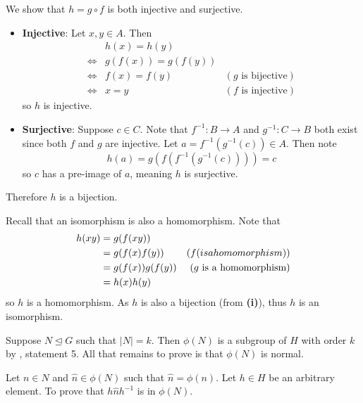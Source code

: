\begin{questions}
    \item \begin{partquestions}{\roman*}
        \item We show that $h = g\circ f$ is both injective and surjective.
        \begin{itemize}
            \item \textbf{Injective}: Let $x, y \in A$. Then
            \begin{align*}
                &h(x) = h(y)\\
                \iff&g(f(x)) = g(f(y))\\
                \iff&f(x) = f(y) & (g \text{ is bijective})\\
                \iff&x = y & (f \text{ is injective})
            \end{align*}
            so $h$ is injective.
            \item \textbf{Surjective}: Suppose $c \in C$. Note that $f^{-1}: B \to A$ and $g^{-1}: C \to B$ both exist since both $f$ and $g$ are injective. Let $a = f^{-1}(g^{-1}(c)) \in A$. Then note
            \[
                h(a) = g(f(f^{-1}(g^{-1}(c)))) = c
            \]
            so $c$ has a pre-image of $a$, meaning $h$ is surjective.
        \end{itemize}
        Therefore $h$ is a bijection.

        \item Recall that an isomorphism is also a homomorphism.  Note that
        \begin{align*}
            h(xy) &= g(f(xy))\\
            &= g(f(x)f(y)) & (f \text( is a homomorphism))\\
            &= g(f(x))g(f(y)) & (g \text{ is a homomorphism})\\
            &= h(x)h(y)
        \end{align*}
        so $h$ is a homomorphism. As $h$ is also a bijection (from \textbf{(i)}), thus $h$ is an isomorphism.
    \end{partquestions}

    \item Suppose $N \unlhd G$ such that $|N| = k$. Then $\phi(N)$ is a subgroup of $H$ with order $k$ by , statement 5. All that remains to prove is that $\phi(N)$ is normal.

    Let $n \in N$ and $\hat{n} \in \phi(N)$ such that $\hat{n} = \phi(n)$. Let $h \in H$ be an arbitrary element. To prove that $h\hat{n}h^{-1}$ is in $\phi(N)$.


\end{questions}
